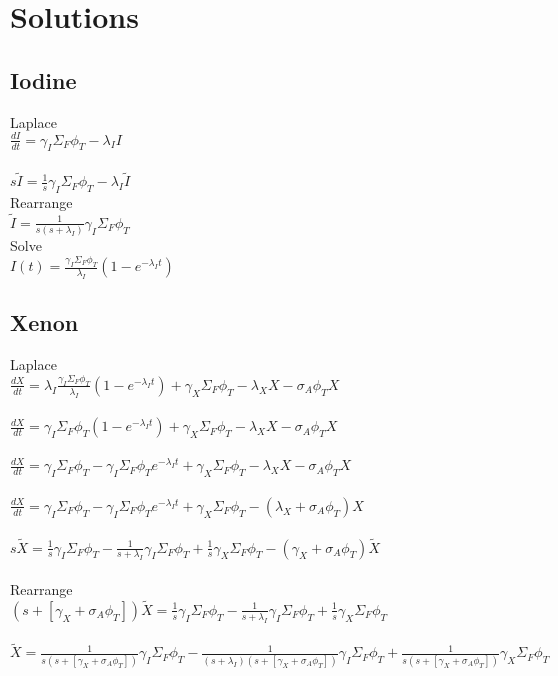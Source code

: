 \documentclass[11pt,a4paper]{article}
\begin{document}
\newpage

\section{Solutions}
\subsection{Iodine}
Laplace \\
$\frac{dI}{dt}=\gamma_I \Sigma_F \phi_T-\lambda_I I$ \\ \\
$s\tilde{I}=\frac{1}{s}\gamma_I\Sigma_F\phi_T-\lambda_I\tilde{I}$ \\

\noindent Rearrange \\
$\tilde{I}=\frac{1}{s(s+\lambda_I)}\gamma_I\Sigma_F\phi_T$ \\

\noindent Solve \\
$I(t)=\frac{\gamma_I\Sigma_F\phi_T}{\lambda_I}(1-e^{-\lambda_I t})$

\subsection{Xenon}
Laplace \\
$\frac{dX}{dt}=\lambda_I \frac{\gamma_I\Sigma_F\phi_T}{\lambda_I}(1-e^{-\lambda_I t}) + \gamma_X \Sigma_F \phi_T - \lambda_X X - \sigma_A \phi_T X$ \\ \\
$\frac{dX}{dt}=\gamma_I\Sigma_F\phi_T(1-e^{-\lambda_I t}) + \gamma_X \Sigma_F \phi_T - \lambda_X X - \sigma_A \phi_T X$ \\ \\
$\frac{dX}{dt}=\gamma_I\Sigma_F\phi_T - \gamma_I\Sigma_F\phi_T e^{-\lambda_I t} + \gamma_X \Sigma_F \phi_T - \lambda_X X - \sigma_A \phi_T X$ \\ \\
$\frac{dX}{dt}=\gamma_I\Sigma_F\phi_T - \gamma_I\Sigma_F\phi_T e^{-\lambda_I t} + \gamma_X \Sigma_F \phi_T - (\lambda_X + \sigma_A \phi_T) X$ \\ \\
$s\tilde{X}=\frac{1}{s}\gamma_I\Sigma_F\phi_T - \frac{1}{s+\lambda_I}\gamma_I\Sigma_F\phi_T + \frac{1}{s}\gamma_X\Sigma_F\phi_T - (\gamma_X+\sigma_A\phi_T)\tilde{X}$ \\ \\

\noindent Rearrange \\
$(s+[\gamma_X+\sigma_A\phi_T])\tilde{X}=\frac{1}{s}\gamma_I\Sigma_F\phi_T - \frac{1}{s+\lambda_I}\gamma_I\Sigma_F\phi_T + \frac{1}{s}\gamma_X\Sigma_F\phi_T$ \\ \\
$\tilde{X}=\frac{1}{s(s+[\gamma_X+\sigma_A\phi_T])}\gamma_I\Sigma_F\phi_T - \frac{1}{(s+\lambda_I)(s+[\gamma_X+\sigma_A\phi_T])}\gamma_I\Sigma_F\phi_T + \frac{1}{s(s+[\gamma_X+\sigma_A\phi_T])}\gamma_X\Sigma_F\phi_T$ \\ \\
\end{document}
